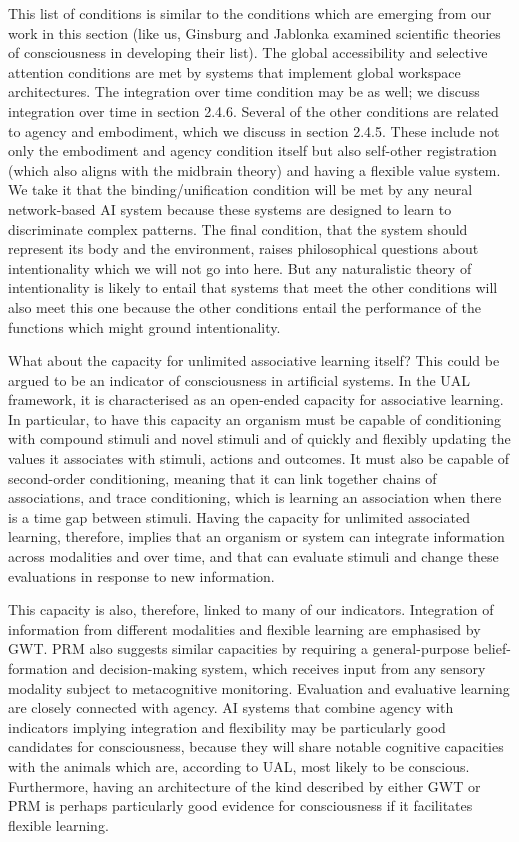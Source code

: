 \documentclass[12pt]{article}
\begin{document}
This list of conditions is similar to the conditions which are emerging from our work in this section (like us, Ginsburg and Jablonka examined scientific theories of consciousness in developing their list). The global accessibility and selective attention conditions are met by systems that implement global workspace architectures. The integration over time condition may be as well; we discuss integration over time in section 2.4.6. Several of the other conditions are related to agency and embodiment, which we discuss in section 2.4.5. These include not only the embodiment and agency condition itself but also self-other registration (which also aligns with the midbrain theory) and having a flexible value system. We take it that the binding/unification condition will be met by any neural network-based AI system because these systems are designed to learn to discriminate complex patterns. The final condition, that the system should represent its body and the environment, raises philosophical questions about intentionality which we will not go into here. But any naturalistic theory of intentionality is likely to entail that systems that meet the other conditions will also meet this one because the other conditions entail the performance of the functions which might ground intentionality.

What about the capacity for unlimited associative learning itself? This could be argued to be an indicator of consciousness in artificial systems. In the UAL framework, it is characterised as an open-ended capacity for associative learning. In particular, to have this capacity an organism must be capable of conditioning with compound stimuli and novel stimuli and of quickly and flexibly updating the values it associates with stimuli, actions and outcomes. It must also be capable of second-order conditioning, meaning that it can link together chains of associations, and trace conditioning, which is learning an association when there is a time gap between stimuli. Having the capacity for unlimited associated learning, therefore, implies that an organism or system can integrate information across modalities and over time, and that can evaluate stimuli and change these evaluations in response to new information.

This capacity is also, therefore, linked to many of our indicators. Integration of information from different modalities and flexible learning are emphasised by GWT. PRM also suggests similar capacities by requiring a general-purpose belief-formation and decision-making system, which receives input from any sensory modality subject to metacognitive monitoring. Evaluation and evaluative learning are closely connected with agency. AI systems that combine agency with indicators implying integration and flexibility may be particularly good candidates for consciousness, because they will share notable cognitive capacities with the animals which are, according to UAL, most likely to be conscious. Furthermore, having an architecture of the kind described by either GWT or PRM is perhaps particularly good evidence for consciousness if it facilitates flexible learning.
\end{document}
